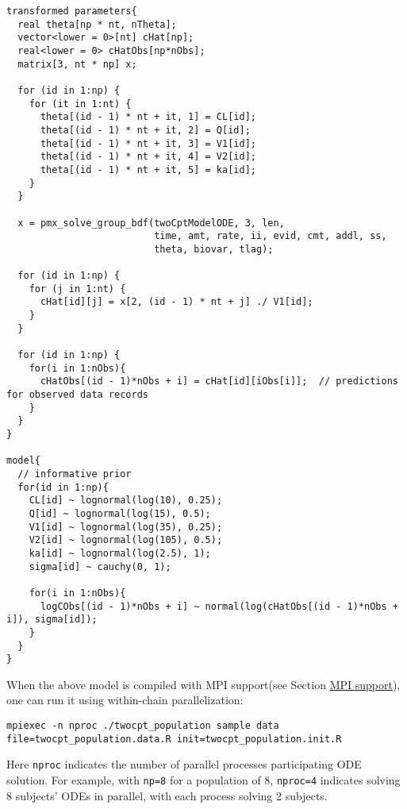 \documentclass[12pt, reqno, oneside]{amsbook}
\numberwithin{equation}{chapter}
\numberwithin{figure}{chapter}
\numberwithin{table}{chapter}
\theoremstyle{remark}
\begin{document}
\begin{verbatim}
transformed parameters{
  real theta[np * nt, nTheta];
  vector<lower = 0>[nt] cHat[np];
  real<lower = 0> cHatObs[np*nObs];
  matrix[3, nt * np] x;

  for (id in 1:np) {
    for (it in 1:nt) {
      theta[(id - 1) * nt + it, 1] = CL[id];
      theta[(id - 1) * nt + it, 2] = Q[id];
      theta[(id - 1) * nt + it, 3] = V1[id];
      theta[(id - 1) * nt + it, 4] = V2[id];
      theta[(id - 1) * nt + it, 5] = ka[id];
    }
  }

  x = pmx_solve_group_bdf(twoCptModelODE, 3, len,
                          time, amt, rate, ii, evid, cmt, addl, ss,
                          theta, biovar, tlag);

  for (id in 1:np) {
    for (j in 1:nt) {
      cHat[id][j] = x[2, (id - 1) * nt + j] ./ V1[id];
    }
  }

  for (id in 1:np) {
    for(i in 1:nObs){
      cHatObs[(id - 1)*nObs + i] = cHat[id][iObs[i]];  // predictions for observed data records
    }
  }
}

model{
  // informative prior
  for(id in 1:np){
    CL[id] ~ lognormal(log(10), 0.25);
    Q[id] ~ lognormal(log(15), 0.5);
    V1[id] ~ lognormal(log(35), 0.25);
    V2[id] ~ lognormal(log(105), 0.5);
    ka[id] ~ lognormal(log(2.5), 1);
    sigma[id] ~ cauchy(0, 1);

    for(i in 1:nObs){
      logCObs[(id - 1)*nObs + i] ~ normal(log(cHatObs[(id - 1)*nObs + i]), sigma[id]);
    }
  }
}
\end{verbatim}

When the above model is compiled with MPI support(see Section
\hyperref[mpi-support]{MPI support}), one can run it using within-chain parallelization:
\begin{verbatim}
mpiexec -n nproc ./twocpt_population sample data file=twocpt_population.data.R init=twocpt_population.init.R
\end{verbatim}
Here \texttt{nproc} indicates the number of parallel
processes participating ODE solution. For example, with
\texttt{np=8} for a population of 8,
\texttt{nproc=4} indicates solving 8 subjects' ODEs in
parallel, with each process solving 2 subjects.
\end{document}
